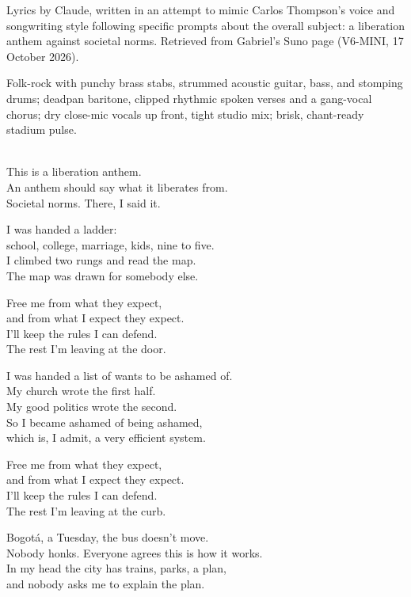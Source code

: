 
\label{sec:liberation-mostly}
\begin{notes}
Lyrics by Claude, written in an attempt to mimic Carlos Thompson's voice and songwriting style following specific prompts about the overall subject: a liberation anthem against societal norms. Retrieved from Gabriel's Suno page (V6-MINI, 17 October 2026).
\end{notes}
\begin{style}
Folk-rock with punchy brass stabs, strummed acoustic guitar, bass, and stomping drums; deadpan baritone, clipped rhythmic spoken verses and a gang-vocal chorus; dry close-mic vocals up front, tight studio mix; brisk, chant-ready stadium pulse.
\end{style}
\begin{lyrics}
\\
This is a liberation anthem.\\
An anthem should say what it liberates from.\\
Societal norms. There, I said it.

I was handed a ladder:\\
school, college, marriage, kids, nine to five.\\
I climbed two rungs and read the map.\\
The map was drawn for somebody else.

Free me from what they expect,\\
and from what I expect they expect.\\
I'll keep the rules I can defend.\\
The rest I'm leaving at the door.

I was handed a list of wants to be ashamed of.\\
My church wrote the first half.\\
My good politics wrote the second.\\
So I became ashamed of being ashamed,\\
which is, I admit, a very efficient system.

Free me from what they expect,\\
and from what I expect they expect.\\
I'll keep the rules I can defend.\\
The rest I'm leaving at the curb.

Bogotá, a Tuesday, the bus doesn't move.\\
Nobody honks. Everyone agrees this is how it works.\\
In my head the city has trains, parks, a plan,\\
and nobody asks me to explain the plan.


\end{lyrics}
